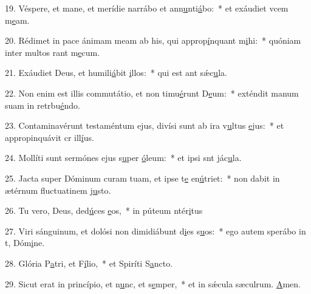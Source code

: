 19. Véspere, et mane, et merídie narrábo et ann\uline{u}nti\uline{á}bo:~* et exáudiet vcem m\uline{e}am.\par 
20. Rédimet in pace ánimam meam ab his, qui approp\uline{í}nquant m\uline{i}hi:~* quóniam inter multos rant m\uline{e}cum.\par 
21. Exáudiet Deus, et humili\uline{á}bit \uline{i}llos:~* qui est ant sǽc\uline{u}la.\par 
22. Non enim est illis commutátio, et non timu\uline{é}runt D\uline{e}um:~* exténdit manum suam in retrbu\uline{é}ndo.\par 
23. Contaminavérunt testaméntum ejus, divísi sunt ab ira v\uline{u}ltus \uline{e}jus:~* et appropinquávit cr ill\uline{í}us.\par 
24. Mollíti sunt sermónes ejus s\uline{u}per \uline{ó}leum:~* et ipsi snt jác\uline{u}la.\par 
25. Jacta super Dóminum curam tuam, et ipse t\uline{e} en\uline{ú}triet:~* non dabit in ætérnum fluctuatinem j\uline{u}sto.\par 
26. Tu vero, Deus, ded\uline{ú}ces \uline{e}os,~* in púteum ntér\uline{i}tus\par 
27. Viri sánguinum, et dolósi non dimidiábunt d\uline{i}es s\uline{u}os:~* ego autem sperábo in t, Dóm\uline{i}ne.\par 
28. Glória P\uline{a}tri, et F\uline{í}lio,~* et Spiríti S\uline{a}ncto.\par 
29. Sicut erat in princípio, et n\uline{u}nc, et s\uline{e}mper,~* et in sǽcula sæculrum. \uline{A}men.\par 
